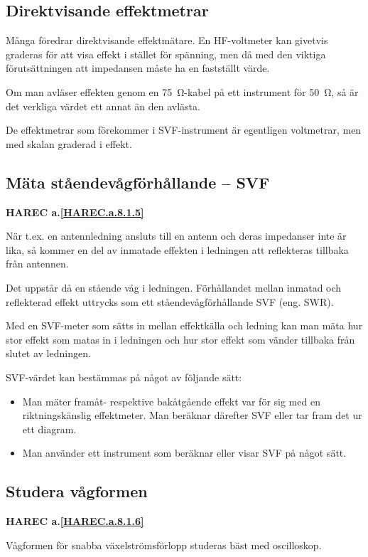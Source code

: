 \subsection{Direktvisande effektmetrar}

Många föredrar direktvisande effektmätare. En HF-voltmeter kan
givetvis graderas för att visa effekt i stället för spänning, men då
med den viktiga förutsättningen att impedansen måste ha en fastställt
värde.

Om man avläser effekten genom en 75~Ω-kabel på ett instrument för 50~Ω, så är
det verkliga värdet ett annat än den avlästa.

De effektmetrar som förekommer i SVF-instrument är egentligen
voltmetrar, men med skalan graderad i effekt.

\subsection{Mäta ståendevågförhållande -- SVF}
\textbf{
HAREC a.\ref{HAREC.a.8.1.5}\label{myHAREC.a.8.1.5}
}
\label{mäta ståendevåg}

När t.ex. en antennledning ansluts till en antenn och deras impedanser
inte är lika, så kommer en del av inmatade effekten i ledningen att
reflekteras tillbaka från antennen.

Det uppstår då en stående våg i ledningen. Förhållandet mellan inmatad
och reflekterad effekt uttrycks som ett ståendevågförhållande SVF
(eng. SWR).

Med en SVF-meter som sätts in mellan effektkälla och ledning kan man
mäta hur stor effekt som matas in i ledningen och hur stor effekt som
vänder tillbaka från slutet av ledningen.

SVF-värdet kan bestämmas på något av följande sätt:
\begin{itemize}
\item Man mäter framåt- respektive bakåtgående effekt var för sig med
  en riktningskänslig effektmeter. Man beräknar därefter SVF eller
  tar fram det ur ett diagram.
\item Man använder ett instrument som beräknar eller visar SVF på
  något sätt.
\end{itemize}

\subsection{Studera vågformen}
\textbf{
HAREC a.\ref{HAREC.a.8.1.6}\label{myHAREC.a.8.1.6}
}

Vågformen för snabba växelströmsförlopp studeras bäst med oscilloskop.

